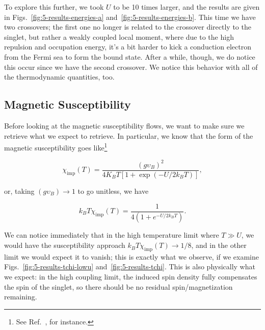To explore this further, we took $U$ to be 10 times larger, and the results are given in Figs.~\ref{fig:5-results-energies-a} and~\ref{fig:5-results-energies-b}. This time we have two crossovers; the first one no longer is related to the crossover directly to the singlet, but rather a weakly coupled local moment, where due to the high repulsion and occupation energy, it's a bit harder to kick a conduction electron from the Fermi sea to form the bound state. After a while, though, we do notice this occur since we have the second crossover. We notice this behavior with all of the thermodynamic quantities, too.

\subsection{Magnetic Susceptibility}

Before looking at the magnetic susceptibility flows, we want to make sure we retrieve what we expect to retrieve. In particular, we know that the form of the magnetic susceptibility goes like\footnote{See Ref.~\cite{Hewson_1993}, for instance.}

\begin{equation}
  \chi_{\mathrm{imp}}(T) = \frac{(g\upsilon_B)^2}{4K_B T[1 + \exp(-U/2k_B T)]},
\end{equation}

or, taking $(g\upsilon_B) \rightarrow 1$ to go unitless, we have

\begin{equation}
  k_B T \chi_{\mathrm{imp}}(T) = \frac{1}{4(1 + e^{-U/2k_B T})}.\label{eq:5-results-tchi}
\end{equation}

We can notice immediately that in the high temperature limit where $T \gg U$, we would have the susceptibility approach $k_B T \chi_{\mathrm{imp}}(T) \rightarrow 1/8$, and in the other limit we would expect it to vanish; this is exactly what we observe, if we examine Figs.~\ref{fig:5-results-tchi-lowu} and~\ref{fig:5-results-tchi}. This is also physically what we expect: in the high coupling limit, the induced spin density fully compensates the spin of the singlet, so there should be no residual spin/magnetization remaining.

